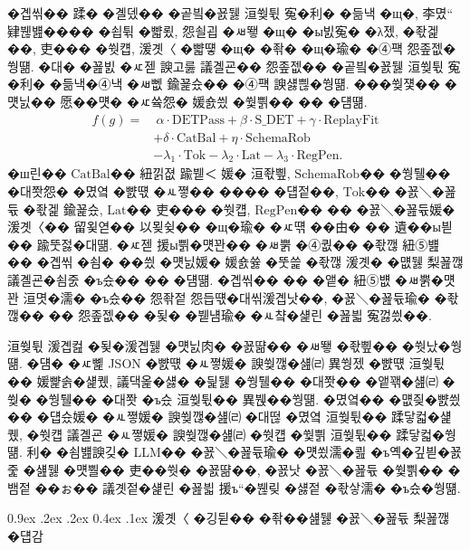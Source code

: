 \documentclass[10pt,twocolumn]{article}
\makeatletter
\renewcommand{\subsection}{\@startsection{subsection}{2}{\z@}%
{0.9ex \@plus .2ex \@minus .2ex}%
{0.4ex \@plus .1ex}%
{\normalfont\normalsize\bfseries}}
\makeatother
\begin{document}
�곕씪�� 蹂� �곌뎄�� �곹빀�꾨뒗 洹쒖튃 寃�利� �듦낵 �щ�, 李몄“ 肄붾뱶���� �쇱튂 �뺣룄, 怨쇨굅 �ㅽ뙣 �щ� �ы빐寃� �λ젰, �좏겙 ��, 吏��� �쒓컙, 湲곗〈 �뺣떟 �щ� �좎� �щ�瑜� �④퍡 怨좊젮�쒕떎. �대� �꾪빐 �ㅼ젣 諛고룷 議곌굔�� 怨좊젮�� �곹빀�꾨뒗 洹쒖튃 寃�利� �듦낵�④낵 �ㅽ뻾 鍮꾩슜�� �④퍡 諛섏쁺�쒕떎. ���쒖쟻�� �먯닔�� 愿��먯� �ㅼ쓬怨� 媛숈씠 �쒗쁽�� �� �덈떎.
\begin{equation}
\begin{aligned}
f(g) = & \ \alpha \cdot \mathrm{DETPass}
       + \beta \cdot \mathrm{S\_DET}
       + \gamma \cdot \mathrm{ReplayFit} \\
       & + \delta \cdot \mathrm{CatBal}
       + \eta \cdot \mathrm{SchemaRob} \\
       & - \lambda_1 \cdot \mathrm{Tok}
       - \lambda_2 \cdot \mathrm{Lat}
       - \lambda_3 \cdot \mathrm{RegPen} .
\end{aligned}
\end{equation}
�ш린�� $\mathrm{CatBal}$�� 紐낅졊 踰붿＜ 媛� 洹좏삎, $\mathrm{SchemaRob}$�� �쒕퉬�� �대쫫怨� �몄옄 �뺤떇 �ㅻ쪟�� ���� �덉젙��, $\mathrm{Tok}$�� �꾨＼�꾪듃 �좏겙 鍮꾩슜, $\mathrm{Lat}$�� 吏��� �쒓컙, $\mathrm{RegPen}$�� �� �꾨＼�꾪듃媛� 湲곗〈�� 留욏엳�� 以묒슂�� �щ�瑜� �ㅼ떆 ��由� �� 遺��ы븯�� 踰뚯젏�대떎. �ㅼ젣 援ы쁽�먯꽌�� �ㅽ뿕 �④퀎�� �좏깮 紐⑤뱶�� �곕씪 �쇰� ��씠 �먯닔媛� 媛숈쓣 �뚯쓽 �좏깮 湲곗� �먮뒗 梨꾪깮 議곌굔�쇰줈 �ъ슜�� �� �덈떎. �곕씪�� �� �앹� 紐⑤뱺 �ㅽ뿕�먯꽌 洹몃�濡� �ъ슜�� 怨좎젙 怨듭떇�대씪湲곕낫��, �꾨＼�꾪듃瑜� �좏깮�� �� 怨좊젮�� �됯� �붿냼瑜� �ㅻ챸�섍린 �꾪븳 寃껋씠��.

洹쒖튃 湲곕컲 �됯�湲곕뒗 �먯닔肉� �꾨땲�� �ㅽ뙣 �좏삎�� �쒓났�쒕떎. �덈� �ㅼ뼱 JSON �뺤떇 �ㅻ쪟媛� 諛쒖깮�섎㈃ 異쒕젰 �뺤떇 洹쒖튃�� 媛뺥솕�섍퀬, 議댁옱�섏� �딅뒗 �쒕퉬�� �대쫫�� �앹꽦�섎㈃ �쒖� �쒕퉬�� �대쫫 �ъ슜 洹쒖튃�� 異붽��쒕떎. �몄옄�� �먮즺�뺤씠�� �덉슜媛� �ㅻ쪟媛� 諛쒖깮�섎㈃ �대떦 �몄옄 洹쒖튃�� 蹂닿컯�섍퀬, �쒓컙 議곌굔 �ㅻ쪟媛� 諛쒖깮�섎㈃ �쒓컙 �쒗쁽 洹쒖튃�� 蹂닿컯�쒕떎. 利� �쇰뱶諛깆� LLM�� �꾨＼�꾪듃瑜� �먯쑀濡�쾶 �ъ옉�깊븯�꾨줉 �섎뒗 �먯뿰�� 吏��쒓� �꾨땲��, �꾨낫 �꾨＼�꾪듃 �쒗쁽�� �뱀젙 ��ぉ�� 議곗젙�섍린 �꾪븳 援ъ“�붾맂 �섏젙 �좏샇濡� �ъ슜�쒕떎.

\subsection{湲곗〈 �깅뒫�� �좎��섎뒗 �꾨＼�꾪듃 梨꾪깮 �덉감}
\end{document}
